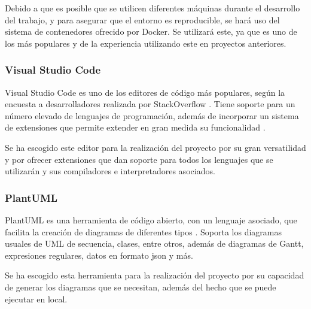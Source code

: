 Debido a que es posible que se utilicen diferentes máquinas durante el desarrollo del trabajo, y para asegurar que el entorno es reproducible, se hará uso del sistema de contenedores ofrecido por Docker. Se utilizará este, ya que es uno de los más populares y de la experiencia utilizando este en proyectos anteriores.

\subsubsection{Visual Studio Code}

Visual Studio Code es uno de los editores de código más populares, según la encuesta a desarrolladores realizada por StackOverflow \cite{2023devsurvey}. Tiene soporte para un número elevado de lenguajes de programación, además de incorporar un sistema de extensiones que permite extender en gran medida su funcionalidad \cite{vscodeweb}.

Se ha escogido este editor para la realización del proyecto por su gran versatilidad y por ofrecer extensiones que dan soporte para todos los lenguajes que se utilizarán y sus compiladores e interpretadores asociados.

\subsubsection{PlantUML}

PlantUML es una herramienta de código abierto, con un lenguaje asociado, que facilita la creación de diagramas de diferentes tipos \cite{plantumlweb}. Soporta los diagramas usuales de UML de secuencia, clases, entre otros, además de diagramas de Gantt, expresiones regulares, datos en formato \acrshort{json} y más.

Se ha escogido esta herramienta para la realización del proyecto por su capacidad de generar los diagramas que se necesitan, además del hecho que se puede ejecutar en local.

